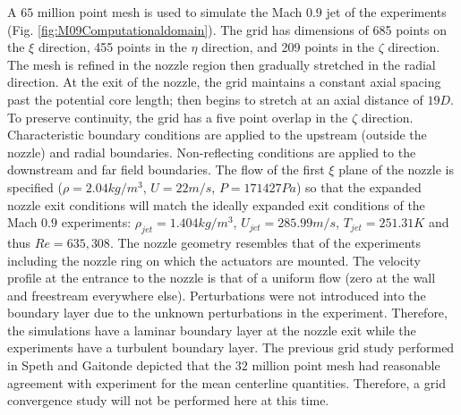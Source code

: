 \documentclass[english]{aiaa-tc}
\begin{document}
A $65$ million point mesh is used to simulate the Mach $0.9$ jet of the experiments (Fig. \ref{fig:M09Computationaldomain}). 
The grid has dimensions of 685 points on the $\xi$ direction, 455 points in the $\eta$ direction, and 209 points in the $\zeta$ direction. The mesh is refined in the nozzle region then gradually stretched in the radial direction. At the exit of the nozzle, the grid maintains a constant axial spacing past the potential core length; then begins to stretch at an axial distance of $19D$. To preserve continuity,  the grid has a five point overlap in the $\zeta$ direction. Characteristic boundary conditions\cite{bj2000-1} are applied to the upstream (outside the nozzle) and radial boundaries. Non-reflecting conditions are applied to the downstream and far field boundaries. The flow of the first $\xi$ plane of the nozzle is specified ($\rho=2.04kg/m^{3}$,
$U=22m/s$, $P=171427Pa$) so that the expanded nozzle exit conditions will match the ideally expanded exit conditions of the Mach $0.9$ experiments: $\rho_{jet}=1.404kg/m^{3}$,
$U_{jet}=285.99m/s$, $T_{jet}=251.31K$ and thus $Re=635,308$. The nozzle geometry resembles that of the experiments including the nozzle ring on which the actuators are mounted. The velocity profile at the entrance to the nozzle is that of a uniform flow (zero at the wall and freestream everywhere else). Perturbations were not introduced into the boundary layer due to the unknown perturbations in the experiment. Therefore, the simulations have a laminar boundary layer at the nozzle exit while the experiments have a turbulent boundary layer.
The previous grid study performed in Speth and Gaitonde\cite{spethASME2013} depicted that the $32$ million point mesh had reasonable agreement with experiment for the mean centerline quantities. Therefore, a grid convergence study will not be performed here at this time.
\end{document}
